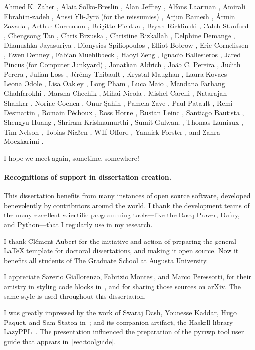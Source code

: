 Ahmed K. Zaher%
, Alaia Solko-Breslin%
, Alan Jeffrey%
, Alfons Laarman%
, Amirali Ebrahim\hyp{}zadeh%
, Anssi Yli-Jyrä (for the reissumies)%
, Arjun Ramesh%
, Ármin Zavada%
, Arthur Correnson%
, Brigitte Pientka%
, Bryan Richlinski%
, Caleb Stanford%
, Chengsong Tan%
, Chris Brzuska%
, Christine Rizkallah%
, Delphine Demange%
, Dhanushka Jayasuriya%
, Dionysios Spiliopoulos%
, Elliot Bobrow%
, Eric Cornelissen%
, Ewen Denney%
, Fabian Muehlboeck%
, Haoyi Zeng%
, Ignacio Ballesteros%
, Jared Pincus (for Computer Junkyard)%
, Jonathan Aldrich%
, João C. Pereira%
, Judith Perera%
, Julian Loss%
, Jérémy Thibault%
, Krystal Maughan%
, Laura Kovacs%
, Leona Odole%
, Lisa Oakley%
, Long Pham%
, Luca Maio%
, Mandana Farhang Ghahfarokhi%
, Marsha Chechik%
, Mihai Nicola%
, Mishel Carelli%
, Natarajan Shankar%
, Norine Coenen%
, Onur Şahin%
, Pamela Zave%
, Paul Patault%
, Remi Desmartin%
, Romain Péchoux%
, Ross Horne%
, Rustan Leino%
, Santiago Bautista%
, Shengyu Huang%
, Shriram Krishnamurthi%
, Sumit Gulwani%
, Thomas Lamiaux%
, Tim Nelson%
, Tobias Nießen%
, Wilf Offord%
, Yannick Forster%
, and Zahra Moezkarimi%
.

I hope we meet again, sometime, somewhere!


\paragraph*{Recognitions of support in dissertation creation.}
This dissertation benefits from many instances of open source software, developed benevolently by contributors around the world.
I thank the development teams of the many excellent scientific programming tools---like the Rocq Prover, Dafny, and Python---that I regularly use in my research.

I thank Clément Aubert for the initiative and action of preparing the general \href{https://github.com/the-au-forml-lab/au_ccs_dissertation_template}{\LaTeX{ }template for doctoral dissertations},
and making it open source.
Now it benefits all students of The Graduate School at Augusta University.

I appreciate Saverio Giallorenzo, Fabrizio Montesi, and Marco Peressotti, for their artistry in styling code blocks in~\cite{giallorenzo2024},
and for sharing those sources on arXiv.
The same style is used throughout this dissertation.

I was greatly impressed by the work of Swaraj Dash, Younesse Kaddar, Hugo Paquet, and Sam Staton in~\cite{dash2023};
and its companion artifact, the Haskell library LazyPPL~\cite{dash2023b}.
The presentation influenced the preparation of the pymwp tool user guide that appears in~\autoref{sec:toolguide}.


